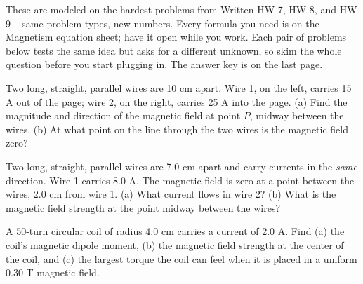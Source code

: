 \documentclass[12pt]{article}
\begin{document}

\noindent These are modeled on the hardest problems from Written HW 7, HW
8, and HW 9 -- same problem types, new numbers. Every formula you need is
on the Magnetism equation sheet; have it open while you work. Each pair of
problems below tests the same idea but asks for a different unknown, so
skim the whole question before you start plugging in. The answer key is on
the last page.


\prob Two long, straight, parallel wires are 10 cm apart. Wire 1, on the
left, carries 15 A out of the page; wire 2, on the right, carries 25 A
into the page. (a) Find the magnitude and direction of the magnetic field
at point $P$, midway between the wires. (b) At what point on the line
through the two wires is the magnetic field zero?

\begin{center}
\end{center}


\prob Two long, straight, parallel wires are 7.0 cm apart and carry
currents in the \emph{same} direction. Wire 1 carries 8.0 A. The magnetic
field is zero at a point between the wires, 2.0 cm from wire 1. (a) What
current flows in wire 2? (b) What is the magnetic field strength at the
point midway between the wires?

\worksp{7cm}

\prob A 50-turn circular coil of radius 4.0 cm carries a current of 2.0 A.
Find (a) the coil's magnetic dipole moment, (b) the magnetic field
strength at the center of the coil, and (c) the largest torque the coil
can feel when it is placed in a uniform 0.30 T magnetic field.

\end{document}
